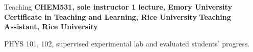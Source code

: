 \begin{rubric}{Teaching}
%
\entry*[\hspace{1.05cm}2021]%
  \textbf{CHEM531, sole instructor 1 lecture, Emory University}
\entry*[\hspace{1.05cm}2020]%
  \textbf{Certificate in Teaching and Learning, Rice University}
\entry*[2015 -- 2016]%
  \textbf{Teaching Assistant, Rice University}
  \par PHYS 101, 102, supervised experimental lab and evaluated students' progress.
\end{rubric}
